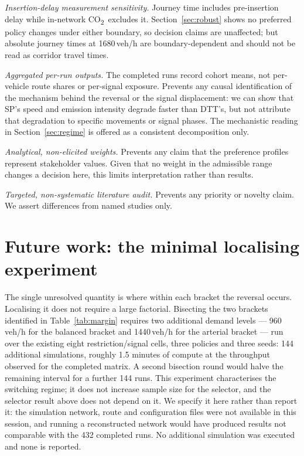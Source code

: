 \documentclass[10pt,a4paper]{article}
\newcommand{\CO}{CO\textsubscript{2}}
\begin{document}
\emph{Insertion-delay measurement sensitivity.} Journey time includes pre-insertion delay while in-network \CO\ excludes it. Section~\ref{sec:robust} shows no preferred policy changes under either boundary, so decision claims are unaffected; but absolute journey times at 1680\,veh/h are boundary-dependent and should not be read as corridor travel times.

\emph{Aggregated per-run outputs.} The completed runs record cohort means, not per-vehicle route shares or per-signal exposure. Prevents any causal identification of the mechanism behind the reversal or the signal displacement: we can show that SP's speed and emission intensity degrade faster than DTT's, but not attribute that degradation to specific movements or signal phases. The mechanistic reading in Section~\ref{sec:regime} is offered as a consistent decomposition only.

\emph{Analytical, non-elicited weights.} Prevents any claim that the preference profiles represent stakeholder values. Given that no weight in the admissible range changes a decision here, this limits interpretation rather than results.

\emph{Targeted, non-systematic literature audit.} Prevents any priority or novelty claim. We assert differences from named studies only.

\section{Future work: the minimal localising experiment}\label{sec:future}
The single unresolved quantity is where within each bracket the reversal occurs. Localising it does not require a large factorial. Bisecting the two brackets identified in Table~\ref{tab:margin} requires two additional demand levels --- 960\,veh/h for the balanced bracket and 1440\,veh/h for the arterial bracket --- run over the existing eight restriction/signal cells, three policies and three seeds: 144 additional simulations, roughly 1.5 minutes of compute at the throughput observed for the completed matrix. A second bisection round would halve the remaining interval for a further 144 runs. This experiment characterises the switching regime; it does not increase sample size for the selector, and the selector result above does not depend on it. We specify it here rather than report it: the simulation network, route and configuration files were not available in this session, and running a reconstructed network would have produced results not comparable with the 432 completed runs. No additional simulation was executed and none is reported.
\end{document}
